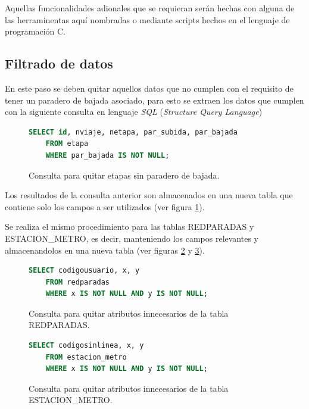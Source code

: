 \documentclass[12pt]{article}
\begin{document}
	Aquellas funcionalidades adionales que se requieran serán hechas con alguna de las herraminentas aquí nombradas o mediante scripts hechos en el lenguaje de programación C.
	
	\subsection{Filtrado de datos}
	
	En este paso se deben quitar aquellos datos que no cumplen con el requisito de tener un paradero de bajada asociado, para esto se extraen los datos que cumplen con la siguiente consulta en lenguaje \textit{SQL} (\textit{Structure Query Language})
	
\begin{figure}[h]
\begin{center}
\begin{lstlisting}[breaklines=true, language=SQL]
	SELECT id, nviaje, netapa, par_subida, par_bajada 
	FROM etapa 
	WHERE par_bajada IS NOT NULL;
\end{lstlisting}
\end{center}
\caption{Consulta para quitar etapas sin paradero de bajada.}
\label{fig:limpiar_datos_etapa}
\end{figure}
	
	Los resultados de la consulta anterior son almacenados en una nueva tabla que contiene solo los campos a ser utilizados (ver figura \ref{fig:limpiar_datos_etapa}).
	
	Se realiza el mismo procedimiento para las tablas REDPARADAS y ESTACION\_METRO, es decir, manteniendo los campos relevantes y almacenandolos en una nueva tabla (ver figuras   \ref{fig:limpiar_datos_redparadas} y \ref{fig:limpiar_datos_estacion_metro}).

\begin{figure}[h]
\begin{center}
\begin{lstlisting}[breaklines=true, language=SQL]
	SELECT codigousuario, x, y  
	FROM redparadas
	WHERE x IS NOT NULL AND y IS NOT NULL;
\end{lstlisting}
\end{center}
\caption{Consulta para quitar atributos innecesarios de la tabla REDPARADAS.}
\label{fig:limpiar_datos_redparadas}
\end{figure}	
	
\begin{figure}[H]
\begin{center}
\begin{lstlisting}[breaklines=true, language=SQL]
	SELECT codigosinlinea, x, y  
	FROM estacion_metro
	WHERE x IS NOT NULL AND y IS NOT NULL;
\end{lstlisting}
\end{center}
\caption{Consulta para quitar atributos innecesarios de la tabla ESTACION\_METRO.}
\label{fig:limpiar_datos_estacion_metro}
\end{figure}	
\end{document}
